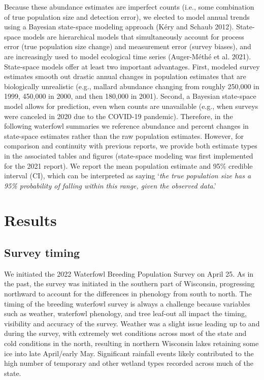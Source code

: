 \documentclass[
  12pt,
]{article}
\begin{document}
Because these abundance estimates are imperfect counts (i.e., some
combination of true population size and detection error), we elected to
model annual trends using a Bayesian state-space modeling approach (Kéry
and Schaub 2012). State-space models are hierarchical models that
simultaneously account for process error (true population size change)
and measurement error (survey biases), and are increasingly used to
model ecological time series (Auger-Méthé et al. 2021). State-space
models offer at least two important advantages. First, modeled survey
estimates smooth out drastic annual changes in population estimates that
are biologically unrealistic (e.g., mallard abundance changing from
roughly 250,000 in 1999, 450,000 in 2000, and then 180,000 in 2001).
Second, a Bayesian state-space model allows for prediction, even when
counts are unavailable (e.g., when surveys were canceled in 2020 due to
the COVID-19 pandemic). Therefore, in the following waterfowl summaries
we reference abundance and percent changes in state-space estimates
rather than the raw population estimates. However, for comparison and
continuity with previous reports, we provide both estimate types in the
associated tables and figures (state-space modeling was first
implemented for the 2021 report). We report the mean population estimate
and 95\% credible interval (CI), which can be interpreted as saying
`\emph{the true population size has a 95\% probability of falling within
this range, given the observed data}.'

\hypertarget{results}{%
\section{Results}\label{results}}

\hypertarget{survey-timing}{%
\subsection{Survey timing}\label{survey-timing}}

We initiated the 2022 Waterfowl Breeding Population Survey on April 25.
As in the past, the survey was initiated in the southern part of
Wisconsin, progressing northward to account for the differences in
phenology from south to north. The timing of the breeding waterfowl
survey is always a challenge because variables such as weather,
waterfowl phenology, and tree leaf-out all impact the timing, visibility
and accuracy of the survey. Weather was a slight issue leading up to and
during the survey, with extremely wet conditions across most of the
state and cold conditions in the north, resulting in northern Wisconsin
lakes retaining some ice into late April/early May. Significant rainfall
events likely contributed to the high number of temporary and other
wetland types recorded across much of the state.
\end{document}
